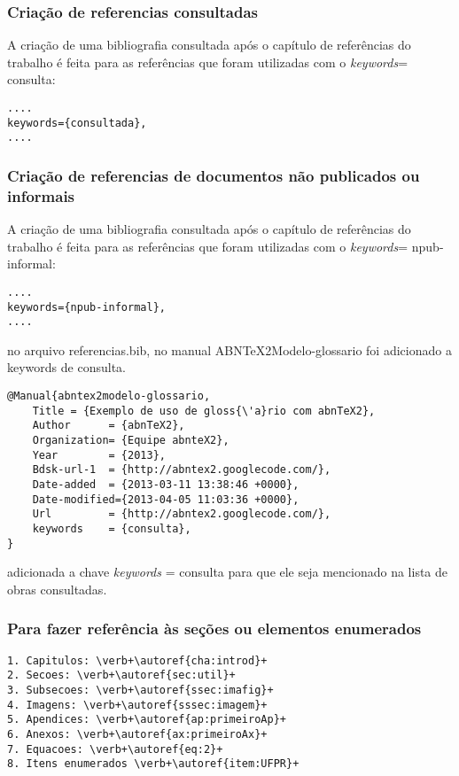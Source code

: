 \subsubsection{Criação de referencias consultadas}

A criação de uma bibliografia consultada após o capítulo de referências do trabalho é feita para as referências que foram utilizadas com o \textit{keywords}= {consulta}:

\begin{lstlisting}
....
keywords={consultada},
....
\end{lstlisting}  


\subsubsection{Criação de referencias de documentos não publicados ou informais}

A criação de uma bibliografia consultada após o capítulo de referências do trabalho é feita para as referências que foram utilizadas com o \textit{keywords}= {npub-informal}:

\begin{lstlisting}
....
keywords={npub-informal},
....
\end{lstlisting}  


no arquivo referencias.bib, no manual ABNTeX2Modelo-glossario foi adicionado a keywords de consulta.

\begin{lstlisting}
@Manual{abntex2modelo-glossario,
	Title = {Exemplo de uso de gloss{\'a}rio com abnTeX2},
	Author      = {abnTeX2},
	Organization= {Equipe abnteX2},
	Year        = {2013},
	Bdsk-url-1  = {http://abntex2.googlecode.com/},
	Date-added  = {2013-03-11 13:38:46 +0000},
	Date-modified={2013-04-05 11:03:36 +0000},
	Url         = {http://abntex2.googlecode.com/},
	keywords    = {consulta},
}
\end{lstlisting}

adicionada a chave \textit{keywords} = {consulta} para que ele seja mencionado na lista de obras consultadas.


\subsubsection{Para fazer referência às seções ou elementos enumerados}

\begin{lstlisting}
1. Capitulos: \verb+\autoref{cha:introd}+ 
2. Secoes: \verb+\autoref{sec:util}+ 
3. Subsecoes: \verb+\autoref{ssec:imafig}+
4. Imagens: \verb+\autoref{sssec:imagem}+ 
5. Apendices: \verb+\autoref{ap:primeiroAp}+ 
6. Anexos: \verb+\autoref{ax:primeiroAx}+ 
7. Equacoes: \verb+\autoref{eq:2}+
8. Itens enumerados \verb+\autoref{item:UFPR}+ 
\end{lstlisting}
